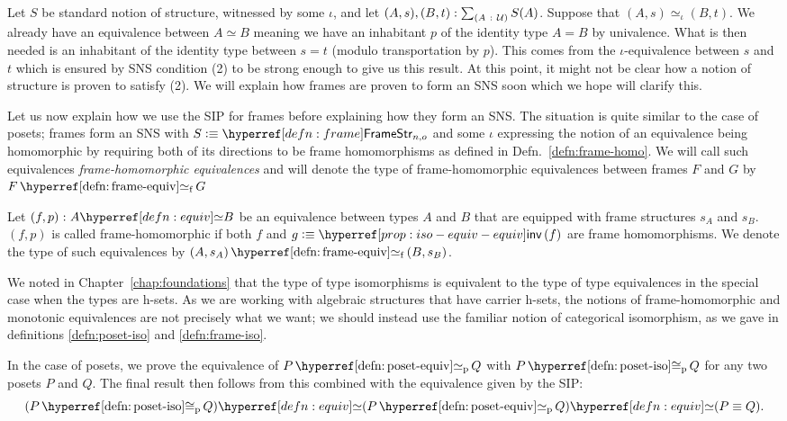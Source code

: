Let $S$ be standard notion of structure, witnessed by some $\iota$, and let
$(A, s), (B, t):\sum_{(A~:~\mathcal{U}{})} S(A)$. Suppose that $(A, s) \simeq_\iota (B, t)$.
We already have an equivalence between $A \simeq B$ meaning we have an inhabitant $p$ of the
identity type $A = B$ by univalence. What is then needed is an inhabitant of the identity
type between $s = t$ (modulo transportation by $p$). This comes from the
$\iota$-equivalence between $s$ and $t$ which is ensured by SNS condition (2) to be strong
enough to give us this result. At this point, it might not be clear how a notion of structure is proven
to satisfy (2). We will explain how frames are proven to form an SNS soon which we hope
will clarify this.

Let us now explain how we use the SIP for frames before explaining how they form an SNS.
The situation is quite similar to the case of posets; frames form an SNS with $S \is
\framestrnm{}_{n, o}$ and some $\iota$ expressing the notion of an equivalence being
homomorphic by requiring both of its directions to be frame homomorphisms as defined in
Defn.~\ref{defn:frame-homo}. We will call such equivalences
\emph{frame-homomorphic equivalences} and will denote the type of frame-homomorphic
equivalences between frames $F$ and $G$ by $\frameequiv{F}{G}$

\begin{defn}\label{defn:frame-equiv}
  Let $\oftyI{(f , p)}{\typequiv{A}{B}}$ be an equivalence between types $A$ and $B$ that
  are equipped with frame structures $s_A$ and $s_B$. $(f, p)$ is called frame-homomorphic
  if both $f$ and $g \is \invequiv{f}$ are frame homomorphisms. We denote the type of such
  equivalences by $\frameequiv{(A, s_A)}{(B , s_B)}$.
\end{defn}

We noted in Chapter~\ref{chap:foundations} that the type of type isomorphisms is
equivalent to the type of type equivalences in the special case when the types are h-sets.
As we are working with algebraic structures that have carrier h-sets, the notions of
frame-homomorphic and monotonic equivalences are not precisely what we want; we should
instead use the familiar notion of categorical isomorphism, as we gave in definitions
\ref{defn:poset-iso} and \ref{defn:frame-iso}.

In the case of posets, we prove the equivalence of $\posetequiv{P}{Q}$ with
$\posetiso{P}{Q}$ for any two posets $P$ and $Q$. The final result then follows from this
combined with the equivalence given by the SIP:
\begin{equation*}
  \typequiv{(\posetiso{P}{Q})}{\typequiv{(\posetequiv{P}{Q})}{(P \equiv Q)}}.
\end{equation*}

